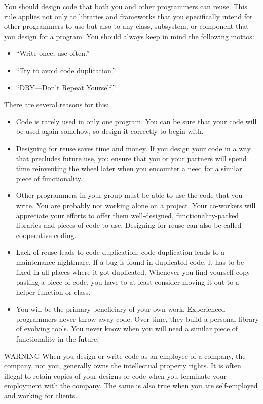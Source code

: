 You should design code that both you and other programmers can reuse. This rule applies not only to libraries and frameworks that you specifically intend for other programmers to use but also to any class, subsystem, or component that you design for a program. You should always keep in mind the following mottos:

\begin{itemize}
\item
“Write once, use often.”

\item
“Try to avoid code duplication.”

\item
“DRY—Don’t Repeat Yourself.”
\end{itemize}

There are several reasons for this:

\begin{itemize}
\item
Code is rarely used in only one program. You can be sure that your code will be used again somehow, so design it correctly to begin with.

\item
Designing for reuse saves time and money. If you design your code in a way that precludes future use, you ensure that you or your partners will spend time reinventing the wheel later when you encounter a need for a similar piece of functionality.

\item
Other programmers in your group must be able to use the code that you write. You are probably not working alone on a project. Your co-workers will appreciate your efforts to offer them well-designed, functionality-packed libraries and pieces of code to use. Designing for reuse can also be called cooperative coding.

\item
Lack of reuse leads to code duplication; code duplication leads to a maintenance nightmare. If a bug is found in duplicated code, it has to be fixed in all places where it got duplicated. Whenever you find yourself copy-pasting a piece of code, you have to at least consider moving it out to a helper function or class.

\item
You will be the primary beneficiary of your own work. Experienced programmers never throw away code. Over time, they build a personal library of evolving tools. You never know when you will need a similar piece of functionality in the future.
\end{itemize}

\begin{myWarning}{WARNING}
When you design or write code as an employee of a company, the company, not you, generally owns the intellectual property rights. It is often illegal to retain copies of your designs or code when you terminate your employment with the company. The same is also true when you are self-employed and working for clients.
\end{myWarning}







